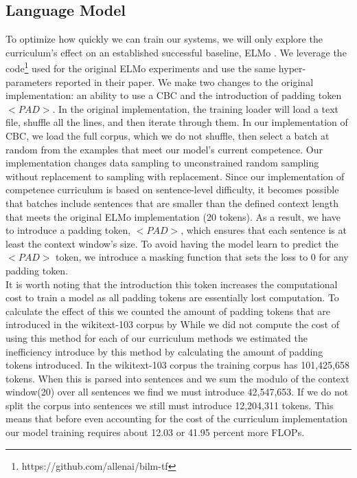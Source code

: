 \subsection{Language Model}
To optimize how quickly we can train our systems, we will only explore the curriculum's effect on an established successful baseline, ELMo \cite{Smith2019ContextualWR}. We leverage the code\footnote{https://github.com/allenai/bilm-tf} used for the original ELMo experiments and use the same hyper-parameters reported in their paper. We make two changes to the original implementation: an ability to use a CBC and the introduction of padding token $<PAD>$. In the original implementation, the training loader will load a text file, shuffle all the lines, and then iterate through them. In our implementation of CBC, we load the full corpus, which we do not shuffle, then select a batch at random from the examples that meet our model's current competence. Our implementation changes data sampling to unconstrained random sampling without replacement to sampling with replacement. Since our implementation of competence curriculum is based on sentence-level difficulty, it becomes possible that batches include sentences that are smaller than the defined context length that meets the original ELMo implementation (20 tokens). As a result, we have to introduce a padding token, $<PAD>$, which ensures that each sentence is at least the context window's size. To avoid having the model learn to predict the $<PAD>$ token, we introduce a masking function that sets the loss to 0 for any padding token. \\
It is worth noting that the introduction this token increases the computational cost to train a model as all padding tokens are essentially lost computation. To calculate the effect of this we counted the amount of padding tokens that are introduced in the wikitext-103 corpus by While we did not compute the cost of using this method for each of our curriculum methods we estimated the inefficiency introduce by this method by calculating the amount of padding tokens introduced. In the wikitext-103 corpus the training corpus has 101,425,658 tokens. When this is parsed into sentences and we sum the modulo of the context window(20) over all sentences we find we must introduce 42,547,653. If we do not split the corpus into sentences we still must introduce 12,204,311 tokens. This means that before even accounting for the cost of the curriculum implementation our model training requires about 12.03 or 41.95 percent more FLOPs. 
